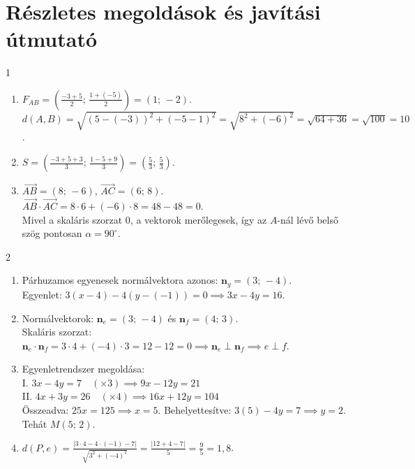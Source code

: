 \documentclass[11pt,a4paper]{article}
\begin{document}
\pagebreak

\section*{\centering\textcolor{primary}{\Large Részletes megoldások és javítási útmutató}}
\vspace{2mm}

\begin{megoldasbox}{1}
\begin{enumerate}
  \item $F_{AB} = \left(\frac{-3+5}{2};\, \frac{1+(-5)}{2}\right) = (1;\, -2)$.\\
        $d(A, B) = \sqrt{(5 - (-3))^2 + (-5 - 1)^2} = \sqrt{8^2 + (-6)^2} = \sqrt{64 + 36} = \sqrt{100} = 10$.
  \item $S = \left(\frac{-3 + 5 + 3}{3};\, \frac{1 - 5 + 9}{3}\right) = \left(\frac{5}{3};\, \frac{5}{3}\right)$.
  \item $\vec{AB} = (8;\, -6)$, $\vec{AC} = (6;\, 8)$.\\
        $\vec{AB} \cdot \vec{AC} = 8 \cdot 6 + (-6) \cdot 8 = 48 - 48 = 0$.\\
        Mivel a skaláris szorzat 0, a vektorok merőlegesek, így az $A$-nál lévő belső szög pontosan $\alpha = 90^\circ$.
\end{enumerate}
\end{megoldasbox}

\begin{megoldasbox}{2}
\begin{enumerate}
  \item Párhuzamos egyenesek normálvektora azonos: $\mathbf{n}_g = (3;\, -4)$.\\
        Egyenlet: $3(x - 4) - 4(y - (-1)) = 0 \implies 3x - 4y = 16$.
  \item Normálvektorok: $\mathbf{n}_e = (3;\, -4)$ és $\mathbf{n}_f = (4;\, 3)$.\\
        Skaláris szorzat: $\mathbf{n}_e \cdot \mathbf{n}_f = 3 \cdot 4 + (-4) \cdot 3 = 12 - 12 = 0 \implies \mathbf{n}_e \perp \mathbf{n}_f \implies e \perp f$.
  \item Egyenletrendszer megoldása:\\
        I. $3x - 4y = 7 \quad (\times 3) \implies 9x - 12y = 21$\\
        II. $4x + 3y = 26 \quad (\times 4) \implies 16x + 12y = 104$\\
        Összeadva: $25x = 125 \implies x = 5$. Behelyettesítve: $3(5) - 4y = 7 \implies y = 2$. Tehát $M(5;\, 2)$.
  \item $d(P, e) = \frac{|3 \cdot 4 - 4 \cdot (-1) - 7|}{\sqrt{3^2 + (-4)^2}} = \frac{|12 + 4 - 7|}{5} = \frac{9}{5} = 1{,}8$.
\end{enumerate}
\end{megoldasbox}
\end{document}
